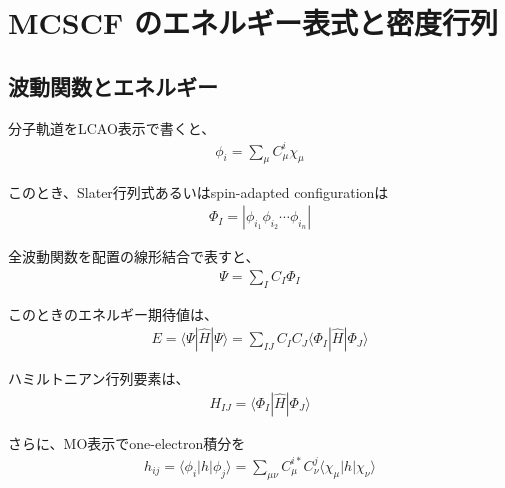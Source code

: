 \documentclass{article}
\begin{document}
\section*{MCSCF のエネルギー表式と密度行列}

\subsection*{波動関数とエネルギー}

分子軌道をLCAO表示で書くと、
\begin{equation}
\begin{split}
\phi_i = \sum_\mu C_{\mu}^{i} \chi_\mu
\label{}
\end{split}
\end{equation}

このとき、Slater行列式あるいはspin-adapted configurationは
\begin{equation}
\begin{split}
\Phi_I = | \phi_{i_1} \phi_{i_2} \cdots \phi_{i_n} |
\label{}
\end{split}
\end{equation}

全波動関数を配置の線形結合で表すと、
\begin{equation}
\begin{split}
\Psi = \sum_I C_I \Phi_I
\label{}
\end{split}
\end{equation}

このときのエネルギー期待値は、
\begin{equation}
\begin{split}
E = \langle \Psi | \hat{H} | \Psi \rangle = \sum_{IJ} C_I C_J \langle \Phi_I | \hat{H} | \Phi_J \rangle
\label{}
\end{split}
\end{equation}

ハミルトニアン行列要素は、
\begin{equation}
\begin{split}
H_{IJ} = \langle \Phi_I | \hat{H} | \Phi_J \rangle
\label{}
\end{split}
\end{equation}

さらに、MO表示でone-electron積分を
\begin{equation}
\begin{split}
h_{ij} = \langle \phi_i | h | \phi_j \rangle = \sum_{\mu\nu} C_{\mu}^{i *} C_{\nu}^{j} \langle \chi_\mu | h | \chi_\nu \rangle
\label{}
\end{split}
\end{equation}
\end{document}
